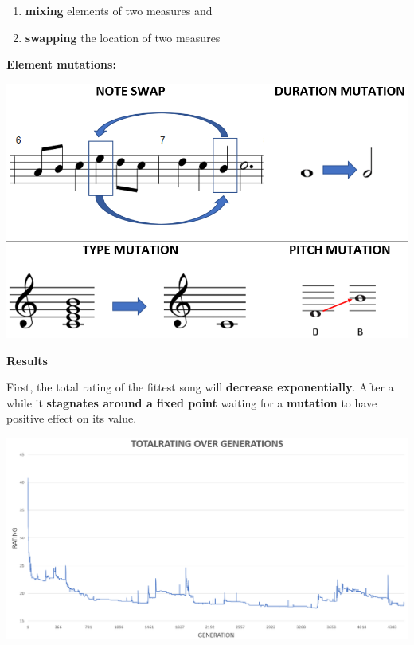 \documentclass[a0,portrait]{a0poster}
\begin{document}
\begin{multicols}{2}
{\begin{enumerate}
	\item \textbf{mixing} elements of two measures and
	\item \textbf{swapping} the location of two measures
\end{enumerate}
	\begin{flushleft}
		\Large{\textbf{Element mutations:}}
	\end{flushleft}
}
\begin{center}
	\includegraphics[width=0.7\linewidth]{mutations}
\end{center}

\begin{flushleft}
	\LARGE{\textbf{Results}}
\end{flushleft}
\Large{First, the total rating of the fittest song will \textbf{decrease exponentially}. After a while it \textbf{stagnates around a fixed point} waiting for a \textbf{mutation} to have positive effect on its value.}
\begin{center}
	\includegraphics[width=1.05\linewidth]{total_rating_graph2}
\end{center}


\end{multicols}
\end{document}

